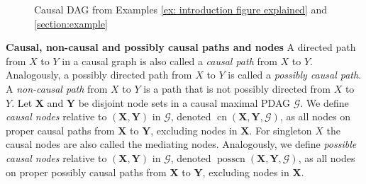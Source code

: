\documentclass[11pt,a4paper]{article}
\theoremstyle{definition}
\theoremstyle{remark}
\DeclareMathOperator{\CN}{cn}
\DeclareMathOperator{\possCN}{posscn}
\newcommand{\mpdag}{maximal PDAG}
\newcommand{\g}[1][G]{\mathcal{#1}}
\newcommand{\cnb}[2][X,Y]{\CN(\mathbf{#1},#2)}
\newcommand{\posscnb}[2][X,Y]{\possCN(\mathbf{#1},#2)}
\begin{document}
\begin{figure}[t]
\begin{center}
 	\end{center}
 	\caption{Causal DAG from Examples \ref{ex: introduction figure explained} and \ref{section:example}}
 	\label{AllinOne}
 \end{figure}
 
 \noindent \textbf{Causal, non-causal and possibly causal paths and nodes} A directed path from $X$ to $Y$ in a causal graph is also called a \textit{causal path} from $X$ to $Y$. Analogously, a possibly directed path from $X$ to $Y$ is called a \textit{possibly causal path}. 
 A \textit{non-causal path} from $X$ to $Y$ is a path that is not possibly directed from $X$ to $Y$.
 Let $\mathbf{X}$ and $\mathbf{Y}$ be disjoint node sets in a causal \mpdag{} $\g$. We define \textit{causal nodes} relative to $(\mathbf{X,Y})$ in $\g$, denoted $\cnb{\g}$, as all nodes on proper causal paths from $\mathbf{X}$ to $\mathbf{Y}$, excluding nodes in $\mathbf{X}$. 
 For singleton $X$ the causal nodes are also called the mediating nodes. 
 Analogously, we define
 \textit{possible causal nodes} relative to $(\mathbf{X,Y})$ in $\g$, denoted $\posscnb{\g}$, as all nodes on proper possibly causal paths from $\mathbf{X}$ to $\mathbf{Y}$, excluding nodes in $\mathbf{X}$. 
 
\end{document}
